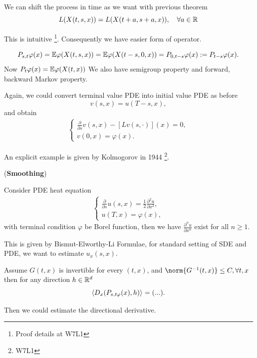 \begin{lem}
We can shift the process in time as we want with previous theorem
\begin{equation*}
    L(X(t,s,x)) = L(X(t+a, s+a, x)), \quad \forall a\in \mathbb{R}
\end{equation*}
\end{lem}
This is intuitive \footnote{Proof details at W7L1}. Consequently we have easier form of operator.

\begin{prop}
\begin{equation*}
    P_{s,t}\varphi(x) = \mathbb{E}\varphi(X(t,s,x)) = \mathbb{E}\varphi(X(t-s,0, x)) = P_{0,t-s}\varphi(x) := P_{t-s}\varphi(x).
\end{equation*}
Now $P_{t}\varphi(x) = \mathbb{E}\varphi(X(t,x))$
We also have semigroup property and forward, backward Markov property.
\end{prop}

\begin{lem}
Again, we could convert terminal value PDE into initial value PDE as before 
\begin{equation*}
    v(s,x) = u(T-s,x),
\end{equation*}
and obtain
\begin{align*}
    \begin{cases}
    \frac{\partial }{\partial s} v(s,x) - [L v(s, \cdot)](x) = 0,\\
    v(0,x) = \varphi(x).
    \end{cases}
\end{align*}
\end{lem}
An explicit example is given by Kolmogorov in 1944 \footnote{W7L1}.

\begin{thm}{(\textbf{Smoothing})}

Consider PDE heat equation 
\begin{align*}
    \begin{cases}
    \frac{\partial }{\partial s} u(s,x) =  \frac{1}{2}\frac{\partial^2 u}{\partial x^2}, \\
    u(T,x) = \varphi(x),
    \end{cases}
\end{align*}
with terminal condition $\varphi$ be Borel function, then we have $\frac{\partial^n u}{\partial x^n}$ exist for all $n\geq 1$.
\end{thm}

This is given by Bismut-Elworthy-Li Formulae, for standard setting of SDE and PDE, we want to estimate $u_x(s,x)$.
\begin{thm}
Assume $G(t,x)$ is invertible for every $(t,x)$, and $\norm{G^{-1}(t,x)} \leq C, \forall t,x$ then for any direction $h\in \mathbb{R}^d$
\begin{equation*}
    \langle{D_x (P_{s,t\varphi}(x), h)} \rangle_{} = (...).
\end{equation*}
\end{thm}
Then we could estimate the directional derivative.

